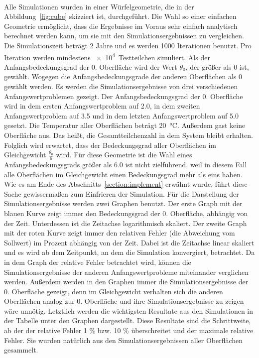 \documentclass{listhesis}
\begin{document}
\paragraph{}
Alle Simulationen wurden in einer Würfelgeometrie, die in der Abbildung~\ref{fig:cube} skizziert ist, durchgeführt. Die Wahl so einer einfachen Geometrie ermöglicht, dass die Ergebnisse im Voraus sehr einfach analytisch berechnet werden kann, um sie mit den Simulationsergebnissen zu vergleichen. Die Simulationszeit beträgt 2 Jahre und es werden 1000 Iterationen benutzt. Pro Iteration werden mindestens \SI{e4}{Testteilchen} simuliert. Als der Anfangsbedeckungsgrad der 0. Oberfläche wird der Wert $\theta_0$, der größer als 0 ist, gewählt. Wogegen die Anfangsbedeckungsgrade der anderen Oberflächen als 0 gewählt werden. Es werden die Simulationsergebnisse von drei verschiedenen Anfangswertproblemen gezeigt. Der Anfangsbedeckungsgrad der 0. Oberfläche wird in dem ersten Anfangswertproblem auf 2.0, in dem zweiten Anfangswertproblem auf 3.5 und in dem letzten Anfangswertproblem auf 5.0 gesetzt. Die Temperatur aller Oberflächen beträgt \SI{20}{\celsius}. Außerdem gast keine Oberfläche aus. Das heißt, die Gesamtteilchenzahl in dem System bleibt erhalten. Folglich wird erwartet, dass der Bedeckungsgrad aller Oberflächen im Gleichgewicht $\frac{\theta_0}{6}$ wird. Für diese Geometrie ist die Wahl eines Anfangsbedeckungsgrads größer als 6.0 ist nicht zielführend, weil in diesem Fall alle Oberflächen im Gleichgewicht einen Bedeckungsgrad mehr als eins haben. Wie es am Ende des Abschnitts~\ref{section:implement} erwähnt wurde, führt diese Sache gewissermaßen zum Einfrieren der Simulation. Für die Darstellung der Simulationsergebnisse werden zwei Graphen benutzt. Der erste Graph mit der blauen Kurve zeigt immer den Bedeckungsgrad der 0. Oberfläche, abhängig von der Zeit. Unterdessen ist die Zeitachse logarithmisch skaliert. Der zweite Graph mit der roten Kurve zeigt immer den relativen Fehler (die Abweichung vom Sollwert) im Prozent abhängig von der Zeit. Dabei ist die Zeitachse linear skaliert und es wird ab dem Zeitpunkt, an dem die Simulation konvergiert, betrachtet. Da in dem Graph der relative Fehler betrachtet wird, können die Simulationsergebnisse der anderen Anfangswertprobleme miteinander verglichen werden. Außerdem werden in den Graphen immer die Simulationsergebnisse der 0. Oberfläche gezeigt, denn im Gleichgewicht verhalten sich die anderen Oberflächen analog zur 0. Oberfläche und ihre Simulationsergebnisse zu zeigen wäre unnötig. Letztlich werden die wichtigsten Resultate aus den Simulationen in der Tabelle unter den Graphen dargestellt. Diese Resultate sind die Schrittweite, ab der der relative Fehler 1 \% bzw. 10 \% überschreitet und der maximale relative Fehler. Sie wurden natürlich aus den Simulationsergebnissen aller Oberflächen gesammelt.
\end{document}
